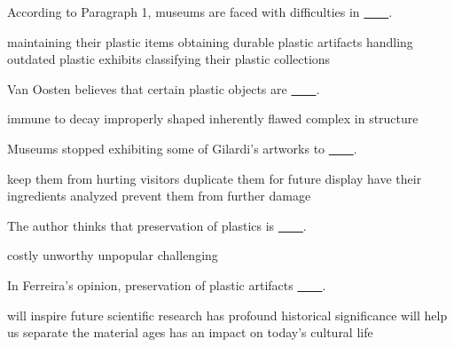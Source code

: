 \item According to Paragraph 1, museums are faced with difficulties in \uline{~~~~}.
\begin{tasks}
	\task maintaining their plastic items
	\task obtaining durable plastic artifacts
	\task handling outdated plastic exhibits
	\task classifying their plastic collections
\end{tasks}
\item Van Oosten believes that certain plastic objects are \uline{~~~~}.
\begin{tasks}
	\task immune to decay
	\task improperly shaped
	\task inherently flawed
	\task complex in structure
\end{tasks}
\item Museums stopped exhibiting some of Gilardi's artworks to \uline{~~~~}.
\begin{tasks}
	\task keep them from hurting visitors
	\task duplicate them for future display
	\task have their ingredients analyzed
	\task prevent them from further damage
\end{tasks}
\item The author thinks that preservation of plastics is \uline{~~~~}.
\begin{tasks}
	\task costly
	\task unworthy
	\task unpopular
	\task challenging
\end{tasks}
\item In Ferreira's opinion, preservation of plastic artifacts \uline{~~~~}.
\begin{tasks}
	\task will inspire future scientific research
	\task has profound historical significance
	\task will help us separate the material ages
	\task has an impact on today's cultural life
\end{tasks}
